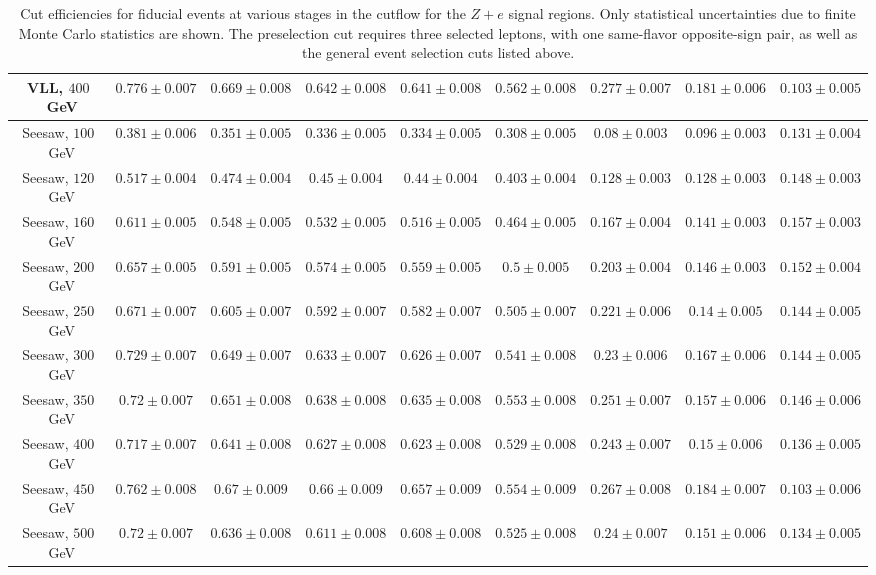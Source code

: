 \begin{table}[ht]
{\begin{tabular}{|c|c|c|c|c|c||c|c|c|}
		\hline
		VLL, $400$~GeV		&	$0.776 \pm 0.007$	&	$0.669 \pm 0.008$	&	$0.642 \pm 0.008$	&	$0.641 \pm 0.008$	&	$0.562 \pm 0.008$	&	$0.277 \pm 0.007$ &	$0.181 \pm 0.006$	&	$0.103 \pm 0.005$	\\
		\hline
		Seesaw, $100$~GeV	&	$0.381 \pm 0.006$	&	$0.351 \pm 0.005$	&	$0.336 \pm 0.005$	&	$0.334 \pm 0.005$	&	$0.308 \pm 0.005$	&	$0.08 \pm 0.003$ &	$0.096 \pm 0.003$	&	$0.131 \pm 0.004$	\\
		\hline
		Seesaw, $120$~GeV	&	$0.517 \pm 0.004$	&	$0.474 \pm 0.004$	&	$0.45 \pm 0.004$	&	$0.44 \pm 0.004$	&	$0.403 \pm 0.004$	&	$0.128 \pm 0.003$ &	$0.128 \pm 0.003$	&	$0.148 \pm 0.003$	\\
		\hline
		Seesaw, $160$~GeV	&	$0.611 \pm 0.005$	&	$0.548 \pm 0.005$	&	$0.532 \pm 0.005$	&	$0.516 \pm 0.005$	&	$0.464 \pm 0.005$	&	$0.167 \pm 0.004$ &	$0.141 \pm 0.003$	&	$0.157 \pm 0.003$	\\
		\hline
		Seesaw, $200$~GeV	&	$0.657 \pm 0.005$	&	$0.591 \pm 0.005$	&	$0.574 \pm 0.005$	&	$0.559 \pm 0.005$	&	$0.5 \pm 0.005$		&	$0.203 \pm 0.004$ &	$0.146 \pm 0.003$	&	$0.152 \pm 0.004$	\\
		\hline
		Seesaw, $250$~GeV	&	$0.671 \pm 0.007$	&	$0.605 \pm 0.007$	&	$0.592 \pm 0.007$	&	$0.582 \pm 0.007$	&	$0.505 \pm 0.007$	&	$0.221 \pm 0.006$ &	$0.14 \pm 0.005$	&	$0.144 \pm 0.005$	\\
		\hline
		Seesaw, $300$~GeV	&	$0.729 \pm 0.007$	&	$0.649 \pm 0.007$	&	$0.633 \pm 0.007$	&	$0.626 \pm 0.007$	&	$0.541 \pm 0.008$	&	$0.23 \pm 0.006$ &	$0.167 \pm 0.006$	&	$0.144 \pm 0.005$	\\
		\hline
		Seesaw, $350$~GeV	&	$0.72 \pm 0.007$	&	$0.651 \pm 0.008$	&	$0.638 \pm 0.008$	&	$0.635 \pm 0.008$	&	$0.553 \pm 0.008$	&	$0.251 \pm 0.007$ &	$0.157 \pm 0.006$	&	$0.146 \pm 0.006$	\\
		\hline
		Seesaw, $400$~GeV	&	$0.717 \pm 0.007$	&	$0.641 \pm 0.008$	&	$0.627 \pm 0.008$	&	$0.623 \pm 0.008$	&	$0.529 \pm 0.008$	&	$0.243 \pm 0.007$ &	$0.15 \pm 0.006$	&	$0.136 \pm 0.005$	\\
		\hline
		Seesaw, $450$~GeV	&	$0.762 \pm 0.008$	&	$0.67 \pm 0.009$	&	$0.66 \pm 0.009$	&	$0.657 \pm 0.009$	&	$0.554 \pm 0.009$	&	$0.267 \pm 0.008$ &	$0.184 \pm 0.007$	&	$0.103 \pm 0.006$	\\
		\hline
		Seesaw, $500$~GeV	&	$0.72 \pm 0.007$	&	$0.636 \pm 0.008$	&	$0.611 \pm 0.008$	&	$0.608 \pm 0.008$	&	$0.525 \pm 0.008$	&	$0.24 \pm 0.007$ &	$0.151 \pm 0.006$	&	$0.134 \pm 0.005$	\\
		\hline
	\end{tabular}
	}
	\caption{Cut efficiencies for fiducial events at various stages in the cutflow for the $Z+e$ signal regions. Only statistical uncertainties due to finite Monte Carlo statistics are shown. The preselection cut requires three selected leptons, with one same-flavor opposite-sign pair, as well as the general event selection cuts listed above.}
	\label{table:fiducial-efficiencies-Ze}
\end{table}


